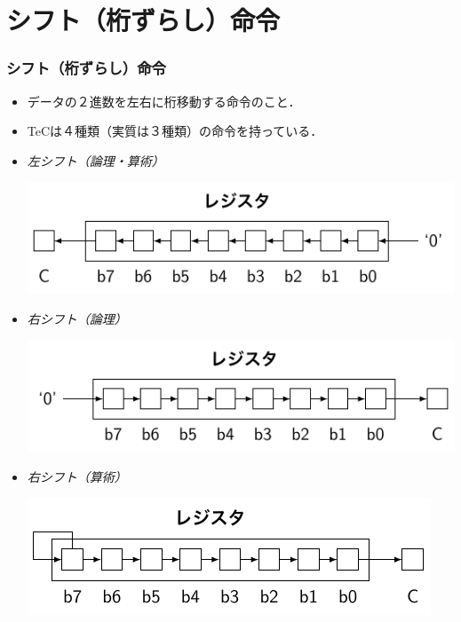 \documentclass[handout]{beamer}        %
\begin{document}
\section{シフト（桁ずらし）命令}
\begin{frame}
  \frametitle{シフト（桁ずらし）命令}
  \begin{itemize}
  \item データの２進数を左右に桁移動する命令のこと．
  \item TeCは４種類（実質は３種類）の命令を持っている．
  \item \emph{左シフト（論理・算術）}\\
    \vspace{-0.3cm}\centerline{\includegraphics[scale=0.7]{../Tikz/shft1.pdf}}
  \item \emph{右シフト（論理）}\\
    \centerline{\includegraphics[scale=0.7]{../Tikz/shft3.pdf}}
  \item \emph{右シフト（算術）}\\
    \centerline{\includegraphics[scale=0.7]{../Tikz/shft2.pdf}}
  \end{itemize}
  \vfill
\end{frame}
\end{document}
